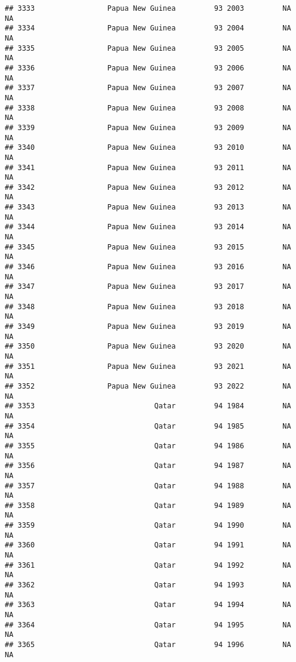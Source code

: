 \documentclass[
]{article}
\begin{document}
\begin{verbatim}
## 3333                 Papua New Guinea         93 2003         NA         NA
## 3334                 Papua New Guinea         93 2004         NA         NA
## 3335                 Papua New Guinea         93 2005         NA         NA
## 3336                 Papua New Guinea         93 2006         NA         NA
## 3337                 Papua New Guinea         93 2007         NA         NA
## 3338                 Papua New Guinea         93 2008         NA         NA
## 3339                 Papua New Guinea         93 2009         NA         NA
## 3340                 Papua New Guinea         93 2010         NA         NA
## 3341                 Papua New Guinea         93 2011         NA         NA
## 3342                 Papua New Guinea         93 2012         NA         NA
## 3343                 Papua New Guinea         93 2013         NA         NA
## 3344                 Papua New Guinea         93 2014         NA         NA
## 3345                 Papua New Guinea         93 2015         NA         NA
## 3346                 Papua New Guinea         93 2016         NA         NA
## 3347                 Papua New Guinea         93 2017         NA         NA
## 3348                 Papua New Guinea         93 2018         NA         NA
## 3349                 Papua New Guinea         93 2019         NA         NA
## 3350                 Papua New Guinea         93 2020         NA         NA
## 3351                 Papua New Guinea         93 2021         NA         NA
## 3352                 Papua New Guinea         93 2022         NA         NA
## 3353                            Qatar         94 1984         NA         NA
## 3354                            Qatar         94 1985         NA         NA
## 3355                            Qatar         94 1986         NA         NA
## 3356                            Qatar         94 1987         NA         NA
## 3357                            Qatar         94 1988         NA         NA
## 3358                            Qatar         94 1989         NA         NA
## 3359                            Qatar         94 1990         NA         NA
## 3360                            Qatar         94 1991         NA         NA
## 3361                            Qatar         94 1992         NA         NA
## 3362                            Qatar         94 1993         NA         NA
## 3363                            Qatar         94 1994         NA         NA
## 3364                            Qatar         94 1995         NA         NA
## 3365                            Qatar         94 1996         NA         NA

\end{verbatim}
\end{document}
